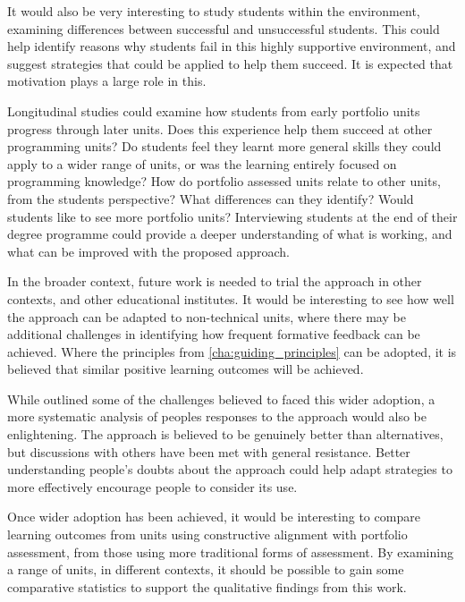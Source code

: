 It would also be very interesting to study students within the environment, examining differences between successful and unsuccessful students. This could help identify reasons why students fail in this highly supportive environment, and suggest strategies that could be applied to help them succeed. It is expected that motivation plays a large role in this.


Longitudinal studies could examine how students from early portfolio units progress through later units. Does this experience help them succeed at other programming units? Do students feel they learnt more general skills they could apply to a wider range of units, or was the learning entirely focused on programming knowledge? How do portfolio assessed units relate to other units, from the students perspective? What differences can they identify? Would students like to see more portfolio units? Interviewing students at the end of their degree programme could provide a deeper understanding of what is working, and what can be improved with the proposed approach.

In the broader context, future work is needed to trial the approach in other contexts, and other educational institutes. It would be interesting to see how well the approach can be adapted to non-technical units, where there may be additional challenges in identifying how frequent formative feedback can be achieved. Where the principles from \cref{cha:guiding_principles} can be adopted, it is believed that similar positive learning outcomes will be achieved.

While  outlined some of the challenges believed to faced this wider adoption, a more systematic analysis of peoples responses to the approach would also be enlightening. The approach is believed to be genuinely better than alternatives, but discussions with others have been met with general resistance. Better understanding people's doubts about the approach could help adapt strategies to more effectively encourage people to consider its use.

Once wider adoption has been achieved, it would be interesting to compare learning outcomes from units using constructive alignment with portfolio assessment, from those using more traditional forms of assessment. By examining a range of units, in different contexts, it should be possible to gain some comparative statistics to support the qualitative findings from this work.



